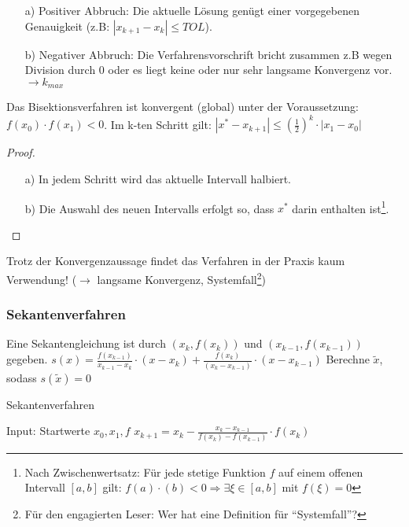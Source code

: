\begin{enumerate}
\item[a)] Positiver Abbruch: Die aktuelle Lösung genügt einer vorgegebenen Genauigkeit
      (z.B: $|x_{k+1}-x_k|\leq TOL$).
\item[b)] Negativer Abbruch: Die Verfahrensvorschrift bricht zusammen z.B wegen Division durch 0
      oder es liegt keine oder nur sehr langsame Konvergenz vor. $\rightarrow k_{max}$
\end{enumerate}

\begin{lemma}
Das Bisektionsverfahren ist konvergent (global) unter der Voraussetzung:
$f(x_0) \cdot f(x_1) <0$. Im k-ten Schritt gilt: $|x^*-x_{k+1}|\leq
(\frac{1}{2})^k \cdot |x_1-x_0|$ 
\end{lemma}

\begin{proof}
~
\begin{enumerate}
\item[a)] In jedem Schritt wird das aktuelle Intervall halbiert. 
\item[b)] Die Auswahl des neuen Intervalls erfolgt so, dass $x^*$ darin
enthalten ist\footnote{Nach Zwischenwertsatz: Für jede stetige Funktion
$f$ auf einem offenen Intervall $[a,b]$ gilt: $f(a)\cdot(b) < 0 \Rightarrow \exists \xi \in [a,b]$ mit $f(\xi) = 0$}.
\end{enumerate}
\end{proof}

Trotz der Konvergenzaussage findet das Verfahren in der Praxis kaum Verwendung!
($\rightarrow$ langsame Konvergenz, Systemfall\footnote{Für den engagierten
Leser: Wer hat eine Definition für ``Systemfall''?})

\subsubsection{Sekantenverfahren}

Eine Sekantengleichung ist durch $(x_k, f(x_k))$ und $(x_{k-1}, f(x_{k-1}))$ gegeben.
\newline
$s(x)=\frac{f(x_{k-1})}{x_{k-1}-x_k} \cdot (x-x_k)+\frac{f(x_k)}{(x_k-x_{k-1})}\cdot (x-x_{k-1})$
\newline
Berechne $\tilde x$, sodass $s(\tilde x)=0$

\begin{algorithm}
\caption{Sekantenverfahren}
\begin{algorithmic}
\STATE Input: Startwerte $x_0, x_1, f$
  \STATE $x_{k+1} = x_k - \frac{x_k-x_{k-1}}{f(x_k)-f(x_{k-1})} \cdot f(x_k)$
\ENDFOR
\end{algorithmic}
\end{algorithm}

